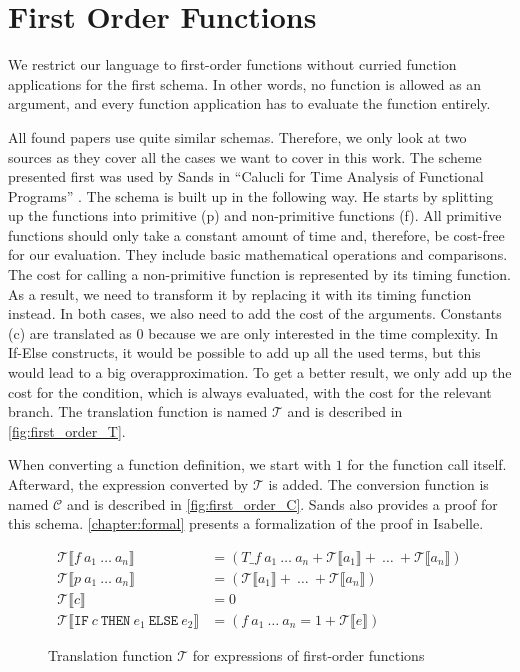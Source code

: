 

\section{First Order Functions} \label{chapter:first_order}

We restrict our language to first-order functions without curried function applications for the first schema.
In other words, no function is allowed as an argument, and every function application has to evaluate the function entirely.

All found papers use quite similar schemas.
Therefore, we only look at two sources as they cover all the cases we want to cover in this work.
The scheme presented first was used by Sands in ``Calucli for Time Analysis of Functional Programs'' \parencite{sands}.
The schema is built up in the following way.
He starts by splitting up the functions into primitive (p) and non-primitive functions (f).
All primitive functions should only take a constant amount of time and, therefore, be cost-free for our evaluation.
They include basic mathematical operations and comparisons.
The cost for calling a non-primitive function is represented by its timing function.
As a result, we need to transform it by replacing it with its timing function instead.
In both cases, we also need to add the cost of the arguments.
Constants (c) are translated as $0$ because we are only interested in the time complexity.
In If-Else constructs, it would be possible to add up all the used terms,
but this would lead to a big overapproximation.
To get a better result, we only add up the cost for the condition, which is always evaluated, with the cost for the relevant branch.
The translation function is named $\mathcal{T}$ and is described in \autoref{fig:first_order_T}.

When converting a function definition, we start with $1$ for the function call itself.
Afterward, the expression converted by $\mathcal{T}$ is added.
The conversion function is named $\mathcal{C}$ and is described in \autoref{fig:first_order_C}.
Sands also provides a proof for this schema.
\autoref{chapter:formal} presents a formalization of the proof in Isabelle.

\begin{figure}
  \begin{align*}
    \mathcal{T}\llbracket f\ a_{1}\ \dots\ a_{n}\rrbracket &= (T\_f\ a_{1}\ \dots\ a_{n} + \mathcal{T}\llbracket a_{1}\rrbracket +\ \dots\ + \mathcal{T}\llbracket a_{n}\rrbracket)\\
    \mathcal{T}\llbracket p\ a_{1}\ \dots\ a_{n}\rrbracket &= (\mathcal{T}\llbracket a_{1}\rrbracket +\ \dots\ + \mathcal{T}\llbracket a_{n}\rrbracket)\\
    \mathcal{T}\llbracket c\rrbracket &= 0\\
    \mathcal{T}\llbracket \texttt{IF}\ c\ \texttt{THEN}\ e_{1}\ \texttt{ELSE}\ e_{2}\rrbracket &= (f\ a_{1}\ \dots\ a_{n} = 1 + \mathcal{T}\llbracket e\rrbracket)
  \end{align*}
  \caption{Translation function $\mathcal{T}$ for expressions of first-order functions}
  \label{fig:first_order_T}
\end{figure}

